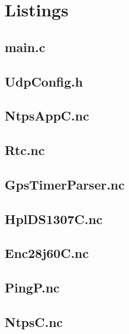 \documentclass[12pt,a4paper,titlepage,oneside]{article}
\begin{document}
\newpage
\appendix
\section{Listings}
\small{

\subsection{main.c}


\subsection{UdpConfig.h}


\subsection{NtpsAppC.nc}


\subsection{Rtc.nc}


\subsection{GpsTimerParser.nc}


\subsection{HplDS1307C.nc}


\subsection{Enc28j60C.nc}


\subsection{PingP.nc}


\subsection{NtpsC.nc}


}
\end{document}
